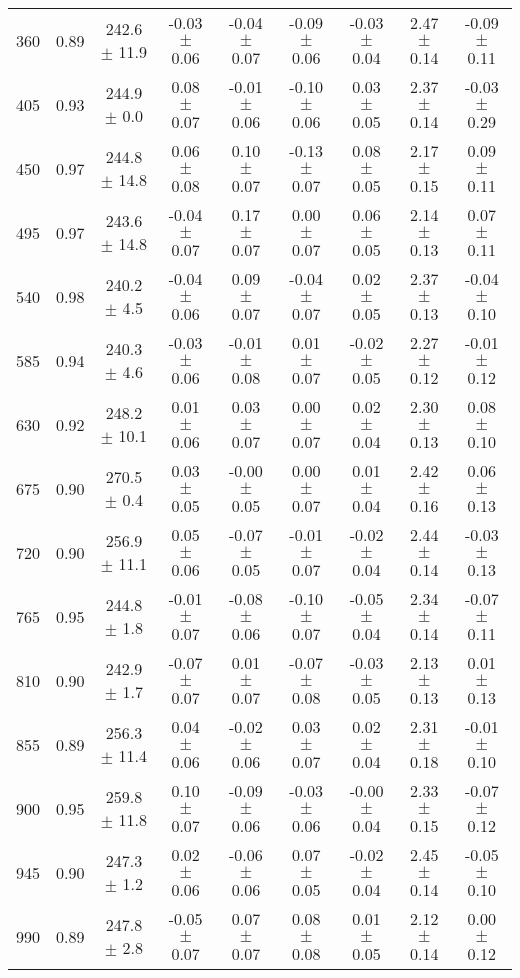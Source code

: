 \documentclass[twocolumn]{aastex61}%
\begin{document}
\begin{table*}[ht]
\begin{tabular}{ccc|ccccc|c}
360 & 0.89 & 242.6 $\pm$ 11.9 & -0.03 $\pm$ 0.06 & -0.04 $\pm$ 0.07 & -0.09 $\pm$ 0.06 & -0.03 $\pm$ 0.04 & 2.47 $\pm$ 0.14 & -0.09 $\pm$ 0.11\\
405 & 0.93 & 244.9 $\pm$ 0.0 & 0.08 $\pm$ 0.07 & -0.01 $\pm$ 0.06 & -0.10 $\pm$ 0.06 & 0.03 $\pm$ 0.05 & 2.37 $\pm$ 0.14 & -0.03 $\pm$ 0.29\\
450 & 0.97 & 244.8 $\pm$ 14.8 & 0.06 $\pm$ 0.08 & 0.10 $\pm$ 0.07 & -0.13 $\pm$ 0.07 & 0.08 $\pm$ 0.05 & 2.17 $\pm$ 0.15 & 0.09 $\pm$ 0.11\\
495 & 0.97 & 243.6 $\pm$ 14.8 & -0.04 $\pm$ 0.07 & 0.17 $\pm$ 0.07 & 0.00 $\pm$ 0.07 & 0.06 $\pm$ 0.05 & 2.14 $\pm$ 0.13 & 0.07 $\pm$ 0.11\\
540 & 0.98 & 240.2 $\pm$ 4.5 & -0.04 $\pm$ 0.06 & 0.09 $\pm$ 0.07 & -0.04 $\pm$ 0.07 & 0.02 $\pm$ 0.05 & 2.37 $\pm$ 0.13 & -0.04 $\pm$ 0.10\\
585 & 0.94 & 240.3 $\pm$ 4.6 & -0.03 $\pm$ 0.06 & -0.01 $\pm$ 0.08 & 0.01 $\pm$ 0.07 & -0.02 $\pm$ 0.05 & 2.27 $\pm$ 0.12 & -0.01 $\pm$ 0.12\\
630 & 0.92 & 248.2 $\pm$ 10.1 & 0.01 $\pm$ 0.06 & 0.03 $\pm$ 0.07 & 0.00 $\pm$ 0.07 & 0.02 $\pm$ 0.04 & 2.30 $\pm$ 0.13 & 0.08 $\pm$ 0.10\\
675 & 0.90 & 270.5 $\pm$ 0.4 & 0.03 $\pm$ 0.05 & -0.00 $\pm$ 0.05 & 0.00 $\pm$ 0.07 & 0.01 $\pm$ 0.04 & 2.42 $\pm$ 0.16 & 0.06 $\pm$ 0.13\\
720 & 0.90 & 256.9 $\pm$ 11.1 & 0.05 $\pm$ 0.06 & -0.07 $\pm$ 0.05 & -0.01 $\pm$ 0.07 & -0.02 $\pm$ 0.04 & 2.44 $\pm$ 0.14 & -0.03 $\pm$ 0.13\\
765 & 0.95 & 244.8 $\pm$ 1.8 & -0.01 $\pm$ 0.07 & -0.08 $\pm$ 0.06 & -0.10 $\pm$ 0.07 & -0.05 $\pm$ 0.04 & 2.34 $\pm$ 0.14 & -0.07 $\pm$ 0.11\\
810 & 0.90 & 242.9 $\pm$ 1.7 & -0.07 $\pm$ 0.07 & 0.01 $\pm$ 0.07 & -0.07 $\pm$ 0.08 & -0.03 $\pm$ 0.05 & 2.13 $\pm$ 0.13 & 0.01 $\pm$ 0.13\\
855 & 0.89 & 256.3 $\pm$ 11.4 & 0.04 $\pm$ 0.06 & -0.02 $\pm$ 0.06 & 0.03 $\pm$ 0.07 & 0.02 $\pm$ 0.04 & 2.31 $\pm$ 0.18 & -0.01 $\pm$ 0.10\\
900 & 0.95 & 259.8 $\pm$ 11.8 & 0.10 $\pm$ 0.07 & -0.09 $\pm$ 0.06 & -0.03 $\pm$ 0.06 & -0.00 $\pm$ 0.04 & 2.33 $\pm$ 0.15 & -0.07 $\pm$ 0.12\\
945 & 0.90 & 247.3 $\pm$ 1.2 & 0.02 $\pm$ 0.06 & -0.06 $\pm$ 0.06 & 0.07 $\pm$ 0.05 & -0.02 $\pm$ 0.04 & 2.45 $\pm$ 0.14 & -0.05 $\pm$ 0.10\\
990 & 0.89 & 247.8 $\pm$ 2.8 & -0.05 $\pm$ 0.07 & 0.07 $\pm$ 0.07 & 0.08 $\pm$ 0.08 & 0.01 $\pm$ 0.05 & 2.12 $\pm$ 0.14 & 0.00 $\pm$ 0.12\\

\end{tabular}
\end{table*}
\end{document}
